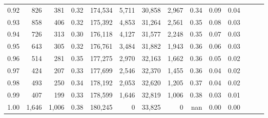 \begin{tabular}{rrrrrrrrrrrrrr}
0.92 &    826 &    381 &  0.32 &  174,534 &    5,711 &  30,858 &   2,967 &  0.34 &  0.09 &      0.04 \\
0.93 &    858 &    406 &  0.32 &  175,392 &    4,853 &  31,264 &   2,561 &  0.35 &  0.08 &      0.03 \\
0.94 &    726 &    313 &  0.30 &  176,118 &    4,127 &  31,577 &   2,248 &  0.35 &  0.07 &      0.03 \\
0.95 &    643 &    305 &  0.32 &  176,761 &    3,484 &  31,882 &   1,943 &  0.36 &  0.06 &      0.03 \\
0.96 &    514 &    281 &  0.35 &  177,275 &    2,970 &  32,163 &   1,662 &  0.36 &  0.05 &      0.02 \\
0.97 &    424 &    207 &  0.33 &  177,699 &    2,546 &  32,370 &   1,455 &  0.36 &  0.04 &      0.02 \\
0.98 &    493 &    250 &  0.34 &  178,192 &    2,053 &  32,620 &   1,205 &  0.37 &  0.04 &      0.02 \\
0.99 &    407 &    199 &  0.33 &  178,599 &    1,646 &  32,819 &   1,006 &  0.38 &  0.03 &      0.01 \\
1.00 &  1,646 &  1,006 &  0.38 &  180,245 &        0 &  33,825 &       0 &   nan &  0.00 &      0.00 \\
\bottomrule
\end{tabular}
